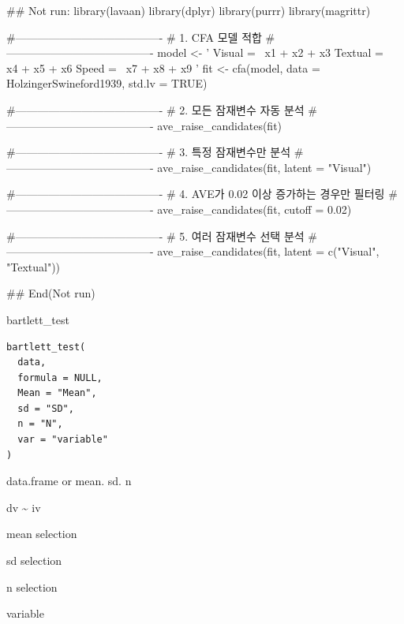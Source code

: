 \documentclass[a4paper]{book}
\begin{document}
\begin{Examples}
\begin{ExampleCode}
\#\# Not run: 
library(lavaan)
library(dplyr)
library(purrr)
library(magrittr)

#----------------------------------------
# 1. CFA 모델 적합
#----------------------------------------
model <- '
  Visual  =~ x1 + x2 + x3
  Textual =~ x4 + x5 + x6
  Speed   =~ x7 + x8 + x9
'
fit <- cfa(model, data = HolzingerSwineford1939, std.lv = TRUE)

#----------------------------------------
# 2. 모든 잠재변수 자동 분석
#----------------------------------------
ave_raise_candidates(fit)

#----------------------------------------
# 3. 특정 잠재변수만 분석
#----------------------------------------
ave_raise_candidates(fit, latent = "Visual")

#----------------------------------------
# 4. AVE가 0.02 이상 증가하는 경우만 필터링
#----------------------------------------
ave_raise_candidates(fit, cutoff = 0.02)

#----------------------------------------
# 5. 여러 잠재변수 선택 분석
#----------------------------------------
ave_raise_candidates(fit, latent = c("Visual", "Textual"))

## End(Not run)
\end{ExampleCode}
\end{Examples}
%
\begin{Description}
bartlett\_test
\end{Description}
%
\begin{Usage}
\begin{verbatim}
bartlett_test(
  data,
  formula = NULL,
  Mean = "Mean",
  sd = "SD",
  n = "N",
  var = "variable"
)
\end{verbatim}
\end{Usage}
%
\begin{Arguments}
\begin{ldescription}
\item[\code{data}] data.frame or mean. sd. n

\item[\code{formula}] dv \textasciitilde{} iv

\item[\code{Mean}] mean selection

\item[\code{sd}] sd selection

\item[\code{n}] n selection

\item[\code{var}] variable
\end{ldescription}
\end{Arguments}
\end{document}
